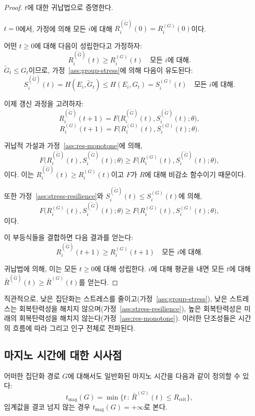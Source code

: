 \documentclass[11pt]{article}
\theoremstyle{plain}
\begin{document}
\begin{proof}
$t$에 대한 귀납법으로 증명한다.

$t=0$에서, 가정에 의해 모든 $i$에 대해 $R_i^{(\tilde{G})}(0) = R_i^{(G)}(0)$이다.

어떤 $t \ge 0$에 대해 다음이 성립한다고 가정하자:
\[
R_i^{(\tilde{G})}(t) \ge R_i^{(G)}(t) \quad \text{모든 } i \text{에 대해}.
\]
$\tilde{G}_t \le G_t$이므로, 가정~\ref{ass:group-stress}에 의해 다음이 유도된다:
\[
S_i^{(\tilde{G})}(t) = H(E_i, \tilde{G}_t) \le H(E_i, G_t) = S_i^{(G)}(t) \quad \text{모든 } i \text{에 대해}.
\]

이제 갱신 과정을 고려하자:
\[
R_i^{(\tilde{G})}(t+1)
= F\bigl(R_i^{(\tilde{G})}(t), S_i^{(\tilde{G})}(t); \theta\bigr),
\]
\[
R_i^{(G)}(t+1)
= F\bigl(R_i^{(G)}(t), S_i^{(G)}(t); \theta\bigr).
\]

귀납적 가설과 가정~\ref{ass:res-monotone}에 의해,
\[
F\bigl(R_i^{(\tilde{G})}(t), S_i^{(\tilde{G})}(t); \theta\bigr)
\ge F\bigl(R_i^{(G)}(t), S_i^{(\tilde{G})}(t); \theta\bigr),
\]
이다. 이는 $R_i^{(\tilde{G})}(t) \ge R_i^{(G)}(t)$이고 $F$가 $R$에 대해 비감소 함수이기 때문이다.

또한 가정~\ref{ass:stress-resilience}와 $S_i^{(\tilde{G})}(t) \le S_i^{(G)}(t)$에 의해,
\[
F\bigl(R_i^{(G)}(t), S_i^{(\tilde{G})}(t); \theta\bigr)
\ge F\bigl(R_i^{(G)}(t), S_i^{(G)}(t); \theta\bigr),
\]
이다.

이 부등식들을 결합하면 다음 결과를 얻는다:
\[
R_i^{(\tilde{G})}(t+1) \ge R_i^{(G)}(t+1) \quad \text{모든 } i \text{에 대해}.
\]

귀납법에 의해, 이는 모든 $t \ge 0$에 대해 성립한다.
$i$에 대해 평균을 내면 모든 $t$에 대해 $\bar{R}^{(\tilde{G})}(t) \ge \bar{R}^{(G)}(t)$를 얻는다.
\end{proof}

직관적으로, 낮은 집단화는 스트레스를 줄이고(가정~\ref{ass:group-stress}), 낮은 스트레스는 회복탄력성을 해치지 않으며(가정~\ref{ass:stress-resilience}), 높은 회복탄력성은 미래의 회복탄력성을 해치지 않는다(가정~\ref{ass:res-monotone}).
이러한 단조성들은 시간의 흐름에 따라 그리고 인구 전체로 전파된다.

\subsection{마지노 시간에 대한 시사점}

어떠한 집단화 경로 $G$에 대해서도 일반화된 마지노 시간을 다음과 같이 정의할 수 있다:
\[
t_{\text{mag}}(G) = \min\{ t \,:\, \bar{R}^{(G)}(t) \le R_{\text{crit}}\},
\]
임계값을 결코 넘지 않는 경우 $t_{\text{mag}}(G) = +\infty$로 본다.
\end{document}
